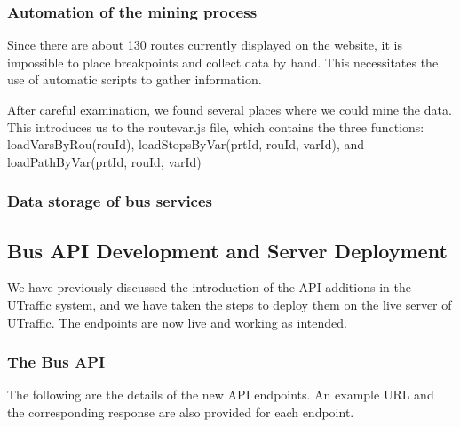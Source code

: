 \subsubsection{Automation of the mining process}

Since there are about 130 routes currently displayed on the website, it is impossible to place breakpoints and collect data by hand. This necessitates the use of automatic scripts to gather information.

After careful examination, we found several places where we could mine the data. This introduces us to the routevar.js file, which contains the three functions: loadVarsByRou(rouId), loadStopsByVar(prtId, rouId, varId), and loadPathByVar(prtId, rouId, varId)

\subsubsection{Data storage of bus services}

\subsection{Bus API Development and Server Deployment}
We have previously discussed the introduction of the API additions in the UTraffic system, and we have taken the steps to deploy them on the live server of UTraffic. The endpoints are now live and working as intended.
\subsubsection{The Bus API}
The following are the details of the new API endpoints. An example URL and the corresponding response are also provided for each endpoint.

